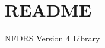 \chapter{README}
\hypertarget{md__d_1_2_source_2_public_github_2_n_f_d_r_s4_2lib_2_r_e_a_d_m_e}{}\label{md__d_1_2_source_2_public_github_2_n_f_d_r_s4_2lib_2_r_e_a_d_m_e}
NFDRS Version 4 Library 